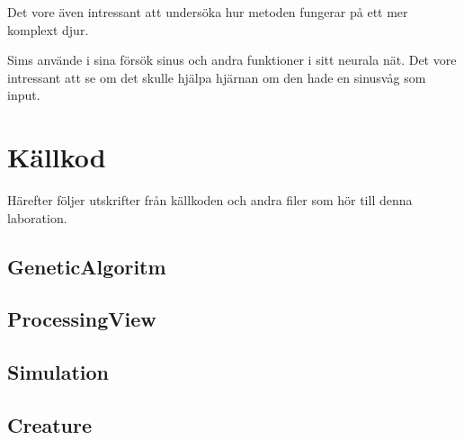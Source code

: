 \documentclass[titlepage, twocolumn, a4paper, 12pt, swedish]{article}
\begin{document}
Det vore även intressant att undersöka hur metoden fungerar på ett mer komplext djur. 

Sims använde i sina försök sinus och andra funktioner i sitt neurala nät. Det vore intressant att se om det skulle hjälpa hjärnan om den hade en sinusvåg som input.








\onecolumn
\newpage
\appendix
{}
\section{Källkod}\label{sec:kallkod}
Härefter följer utskrifter från källkoden och andra filer som hör till
denna laboration.

\subsection{GeneticAlgoritm}\label{app:GeneticAlgoritm}
\begin{footnotesize}
  
\end{footnotesize}

\subsection{ProcessingView}\label{app:ProcessingView}
\begin{footnotesize}
  
\end{footnotesize}

\subsection{Simulation}\label{app:Simulation}
\begin{footnotesize}
  
\end{footnotesize}

\subsection{Creature}\label{app:Creature}
\begin{footnotesize}
  
\end{footnotesize}
\end{document}
